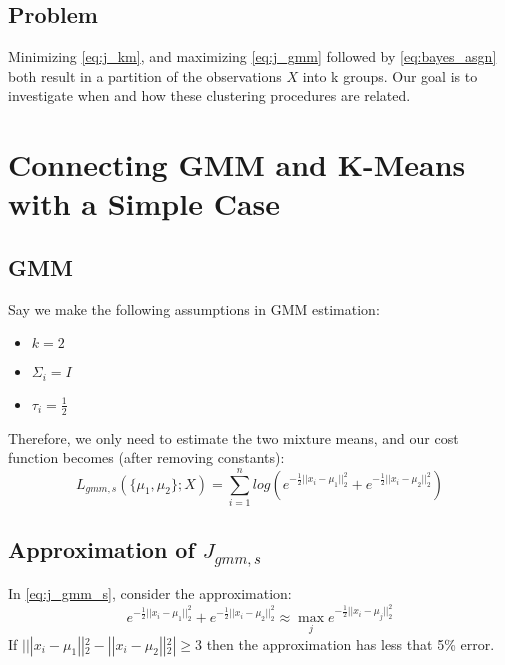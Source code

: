 \documentclass{article}
\begin{document}
\subsection{Problem}
\quad
Minimizing \eqref{eq:j_km}, and maximizing \eqref{eq:j_gmm} followed by \eqref{eq:bayes_asgn} both result in a partition of the observations $X$ into k groups. Our goal is to investigate when and how these clustering procedures are related.




\section{Connecting GMM and K-Means with a Simple Case} \label{simple_case}
\subsection{GMM}
Say we make the following assumptions in GMM estimation:
\begin{itemize}
\item $k=2$
\item $\Sigma_i = I$
\item $\tau_i = \frac{1}{2}$
\end{itemize}

\noindent Therefore, we only need to estimate the two mixture means, and our cost function becomes (after removing constants):
\begin{equation}
\label{eq:j_gmm_s}
L_{gmm,s}(\{ \mu_1, \mu_2 \};X)= \sum\limits_{i=1}^n log(e^{-\frac{1}{2}||x_i-\mu_1||_2^2}+e^{-\frac{1}{2}||x_i-\mu_2||_2^2})
\end{equation}

\begin{comment} %
In the EM algorithm, the E step involves calculating, for every $x_i$:
\[ w_{i,1} = \frac{e^{-||x_i-\mu_1||_2^2}}{e^{-||x_i-\mu_1||_2^2}+e^{-||x_i-\mu_2||_2^2}}\]
\[ w_{i,2} = \frac{e^{-||x_i-\mu_2||_2^2}}{e^{-||x_i-\mu_1||_2^2}+e^{-||x_i-\mu_2||_2^2}}\]
Then the M step consists of calculating:
\[ \tau_1^{t+1} =  \frac{1}{n} \sum\limits_{i=1}^n w_{i,1}, \; \; \; \tau_2^{t+1} =  \frac{1}{n} \sum\limits_{i=1}^n w_{i,2}\]
\[\mu_1^{t+1} = \frac{\sum\limits_{i=1}^n w_{i,1} x_i}{\sum\limits_{i=1}^n w_{i,1}}, \;\;\; \mu_2^{t+1} = \frac{\sum\limits_{i=1}^n w_{i,2} x_i}{\sum\limits_{i=1}^n w_{i,2}} \]
\end{comment} %

\subsection{Approximation of $J_{gmm,s}$}
In \eqref{eq:j_gmm_s}, consider the approximation:
\[ e^{-\frac{1}{2}||x_i-\mu_1||_2^2}+e^{-\frac{1}{2}||x_i-\mu_2||_2^2} \approx \max_{j} e^{-\frac{1}{2}||x_i-\mu_j||_2^2} \]
If $|||x_i-\mu_1||_2^2 - ||x_i-\mu_2||_2^2| \ge 3$ then the approximation has less that 5\% error. \\
\end{document}
